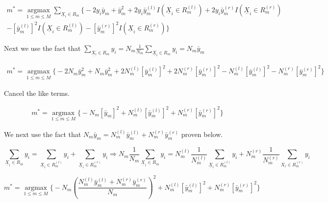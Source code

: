 \documentclass[11pt]{article}
\begin{document}
\begin{equation}
\begin{split}
m^* = \underset{1 \leq m \leq M}{\operatorname{argmax}} \sum_{\underline{X}_i \in R_m} \Bigg\{-2y_i\bar{y}_m + \bar{y}_m^2 + 2y_i\bar{y}_m^{(l)}I(\underline{X}_i \in R_m^{(l)}) + 2y_i\bar{y}_m^{(r)}I(\underline{X}_i \in R_m^{(r)})\\ - [\bar{y}_m^{(l)}]^2I(\underline{X}_i \in R_m^{(l)}) - [\bar{y}_m^{(r)}]^2I(\underline{X}_i \in R_m^{(r)})\Bigg\}
\end{split}
\end{equation}

Next we use the fact that $\sum_{\underline{X_i} \in R_m} y_i = N_m\frac{1}{N_m} \sum_{\underline{X}_i \in R_m}y_i = N_m \bar{y}_m$

\begin{equation}
\begin{split}
m^* = \underset{1 \leq m \leq M}{\operatorname{argmax}} \Bigg\{-2N_m\bar{y}_m^2 +N_m\bar{y}_m^2 + 2N_m^{(l)}[\bar{y}_m^{(l)}]^2 + 2N_m^{(r)}[\bar{y}_m^{(r)}]^2  -N_m^{(l)}[\bar{y}_m^{(l)}]^2 -N_m^{(r)}[\bar{y}_m^{(r)}]^2\Bigg\}
\end{split}
\end{equation}

Cancel the like terms. 

\begin {equation}
\begin{split}
m^* = \underset{1 \leq m \leq M}{\operatorname{argmax}} \Bigg\{-N_m[\bar{y}_m]^2 + N_m^{(l)}[\bar{y}_m^{(l)}]^2 +N_m^{(r)}[\bar{y}_m^{(r)}]^2\Bigg\}
\end{split}
\end{equation}

We next use the fact that $N_m\bar{y}_m = N_m^{(l)}\bar{y}_m^{(l)} + N_m^{(r)}\bar{y}_m^{(r)}$ proven below.

$$ \sum_{\underline{X}_i \in R_m} y_i = \sum_{\underline{X}_i \in R_m^{(l)}}y_i + \sum_{\underline{X}_i \in R_m^{(r)}} y_i \Rightarrow N_m \frac{1}{N_m} \sum_{\underline{X}_i \in R_m}y_i = N_m^{(l)}\frac{1}{N_m^{(l)}} \sum_{\underline{X}_i \in R_m^{(l)}}y_i + N_m^{(r)}\frac{1}{N_m^{(r)}}\sum_{X_i \in R_m^{(r)}}y_i $$

\begin {equation}
m^* = \underset{1 \leq m \leq M}{\operatorname{argmax}} \Bigg\{ -N_m ( \frac{N_m^{(l)}\bar{y}_m^{(l)} + N_m^{(r)}\bar{y}_m^{(r)}}{N_m})^2 + N_m^{(l)}[\bar{y}_m^{(l)}]^2 + N_m^{(r)}[\bar{y}_m^{(r)}]^2\Bigg\}
\end{equation}
\end{document}
